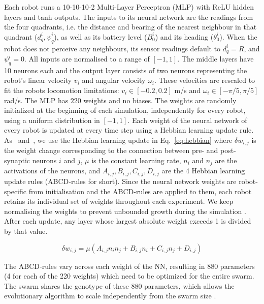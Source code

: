\documentclass[runningheads]{llncs}
\begin{document}
Each robot runs a 10-10-10-2 Multi-Layer Perceptron (MLP) with ReLU hidden layers and tanh outputs. The inputs to its neural network are the readings from the four quadrants, i.e. the distance and bearing of the nearest neighbour in that quadrant ($d^i_q, \psi^i_q$), as well as its battery level ($B^i_0$) and its heading ($\theta^i_0$). When the robot does not perceive any neighbours, its sensor readings default to $d^i_q=R$, and $\psi^i_q=0$. All inputs are normalised to a range of $[-1,1]$. The middle layers have 10 neurons each and the output layer consists of two neurons representing the robot's linear velocity $v_i$ and  angular velocity $\omega_i$. These velocities are rescaled to fit the robots locomotion limitations: $v_i \in[-0.2,0.2]$ m/s and $\omega_i \in[-\pi/5,\pi/5]$ rad/s. The MLP has $220$ weights and no biases. The weights are randomly initialized at the beginning of each simulation, independently for every robot, using a uniform distribution in $[-1,1]$. Each weight of the neural network of every robot is updated at every time step using a Hebbian learning update rule. As~\cite{vandiggelen2025emergentheterogeneousswarmcontrol} and~\cite{mahdavi2026energy}, we use the Hebbian learning update in Eq.~\ref{eq:hebbian} where  $\delta w_{i,j}$ is the weight change corresponding to the connection between pre- and post-synaptic neurons $i$ and $j$, $\mu$ is the constant learning rate, $n_i$ and $n_j$ are the activations of the neurons, and $A_{i,j},B_{i,j},C_{i,j},D_{i,j}$ are the 4 Hebbian learning update rules (ABCD-rules for short).
Since the neural network weights are robot-specific from initialisation and the ABCD-rules are applied to them, each robot retains its individual set of weights throughout each experiment. We keep normalising the weights to prevent unbounded growth during the simulation \cite{leung2025bioinspiredplasticneuralnetworks}. After each update, any layer whose largest absolute weight exceeds 1 is divided by that value.

\begin{equation}
    \delta w_{i,j}=\mu(A_{i,j}n_in_j+B_{i,j}n_i+C_{i,j}n_j+D_{i,j})
    \label{eq:hebbian}
\end{equation}

The ABCD-rules vary across each weight of the NN, resulting in 880 parameters (4 for each of the 220 weights) which need to be optimized for the entire swarm.
The swarm shares the genotype of these 880 parameters, which allows the evolutionary algorithm to scale independently from the swarm size \cite{vandiggelen2025emergentheterogeneousswarmcontrol}.
\end{document}
